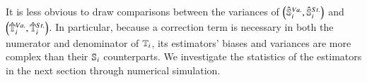 It is less obvious to draw comparisons between the variances of $\left(\unpollSsalt{i},\pollSsalt{i}\right)$ and $\left(\unpollTsalt{i},\pollTsalt{i}\right)$.
In particular, because a correction term is necessary in both the numerator and denominator of $\T{i}$, its estimators' biases and variances are more complex than their $\S{i}$ counterparts. 
We investigate the statistics of the estimators in the next section through numerical simulation.